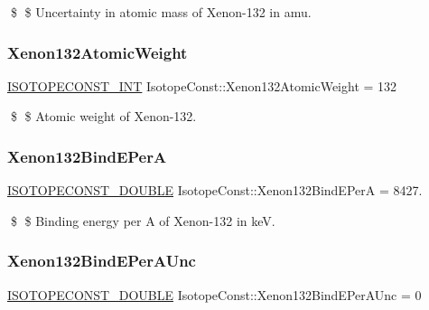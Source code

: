 \$ \$ Uncertainty in atomic mass of Xenon-\/132 in amu. \mbox{\label{group___isotope_const-_xenon-_xe132_gaafa63b4d0d9d1639c75dad7de8611aa9}} 
\subsubsection{\texorpdfstring{Xenon132\+Atomic\+Weight}{Xenon132AtomicWeight}}
{\footnotesize\ttfamily \mbox{\hyperlink{group___isotope_const-_macros_ga5f18360b3e99483a35c32d789e62621c}{I\+S\+O\+T\+O\+P\+E\+C\+O\+N\+S\+T\+\_\+\+I\+NT}} Isotope\+Const\+::\+Xenon132\+Atomic\+Weight = 132}

\$ \$ Atomic weight of Xenon-\/132. \mbox{\label{group___isotope_const-_xenon-_xe132_gae9c76dedcff8543f7ffca27d386b825f}} 
\subsubsection{\texorpdfstring{Xenon132\+Bind\+E\+PerA}{Xenon132BindEPerA}}
{\footnotesize\ttfamily \mbox{\hyperlink{group___isotope_const-_macros_ga8f45a7272ce02c0b4c65c44636ed719a}{I\+S\+O\+T\+O\+P\+E\+C\+O\+N\+S\+T\+\_\+\+D\+O\+U\+B\+LE}} Isotope\+Const\+::\+Xenon132\+Bind\+E\+PerA = 8427.}

\$ \$ Binding energy per A of Xenon-\/132 in keV. \mbox{\label{group___isotope_const-_xenon-_xe132_ga55385716c13e503bbce2cfb4be273692}} 
\subsubsection{\texorpdfstring{Xenon132\+Bind\+E\+Per\+A\+Unc}{Xenon132BindEPerAUnc}}
{\footnotesize\ttfamily \mbox{\hyperlink{group___isotope_const-_macros_ga8f45a7272ce02c0b4c65c44636ed719a}{I\+S\+O\+T\+O\+P\+E\+C\+O\+N\+S\+T\+\_\+\+D\+O\+U\+B\+LE}} Isotope\+Const\+::\+Xenon132\+Bind\+E\+Per\+A\+Unc = 0}


